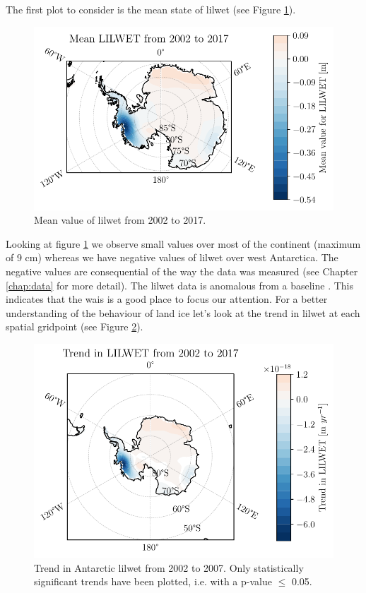 \documentclass[../main.tex]{subfiles}
\begin{document}
The first plot to consider is the mean state of \gls{lilwet} (see Figure \ref{fig:lilwet_mean}).
 \begin{figure}[!hbt]
     \centering
     \includegraphics{images/2021w5/chapter7/hres/mean_spatial_LIC}
     \caption{Mean value of \gls{lilwet} from 2002 to 2017.}
     \label{fig:lilwet_mean}
 \end{figure}
 Looking at figure \ref{fig:lilwet_mean} we observe small values over most of the continent (maximum of 9 cm) whereas we have negative values of \gls{lilwet} over west Antarctica. The negative values are consequential of the way the data was measured (see Chapter \ref{chap:data} for more detail). The \gls{lilwet} data is anomalous from a baseline . This indicates that the \gls{wais} is a good place to focus our attention. For a better understanding of the behaviour of land ice let's look at the trend in \gls{lilwet} at each spatial gridpoint (see Figure \ref{fig:lilwet_trend}).
\begin{figure}[!hbt]
    \centering
    \includegraphics{images/2021w5/chapter7/hres/trend_spatial_LIC}
    \caption{Trend in Antarctic \gls{lilwet} from 2002 to 2007. Only statistically significant trends have been plotted, i.e. with a p-value $\leq$ 0.05.}
    \label{fig:lilwet_trend}
\end{figure}
\end{document}
